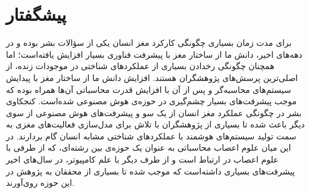 \documentclass[12pt]{report}
\begin{document}
	
	\onehalfspacing
	
	\chapter*{پیشگفتار }
	برای مدت زمان بسیاری چگونگی کارکرد مغز انسان یکی از  سؤالات بشر بوده و در دهه‌های اخیر، دانش ما از ساختار مغز با پیشرفت فناوری بسیار افزایش یافته‌‌است؛ اما همچنان چگونگی رخدادن بسیاری از عملکرد‌های شناختی در موجودات زنده، از اصلی‌ترین پرسش‌های پژوهشگران هستند. افزایش دانش ما از ساختار مغز با پیدایش سیستم‌های محاسبه‌گر و پس از آن با افزایش قدرت محاسباتی آن‌ها همراه بوده که موجب پیشرفت‌های بسیار چشم‌گیری در حوزه‌ی هوش مصنوعی شده‌است. کنجکاوی بشر در چگونگی عملکرد مغز انسان از یک سو و پیشرفت‌های هوش مصنوعی از سوی دیگر باعث شده تا بسیاری از پژوهشگران با تلاش برای مدل‌سازی فعالیت‌های مغزی به سمت تولید سیستم‌های هوشمند با عملکرد‌های شناختی مشابه انسان گام بردارند. در این میان علوم ‌اعصاب محاسباتی به عنوان یک حوزه‌ی بین رشته‌ای، که از طرفی با علوم اعصاب در ارتباط است و از طرف دیگر با علم کامپیوتر، در سال‌های اخیر پیشرفت‌های بسیاری داشته‌است که موجب شده تا بسیاری از محققان به پژوهش در این حوزه روی‌آورند.
	
\end{document}
